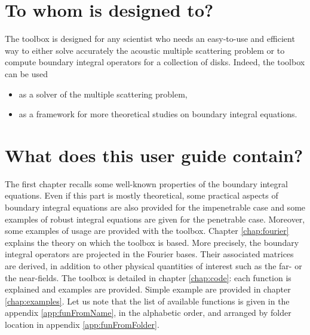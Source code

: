 \section*{To whom \mudiff is designed to?}

The toolbox \mudiff is designed for any  scientist who needs an easy-to-use and efficient way to either solve accurately the acoustic multiple scattering problem  or
 to compute boundary integral operators for a collection of disks. Indeed, the \mudiff toolbox can be used
\begin{itemize}
\item as a solver of the multiple scattering problem,%
\item as a framework for more theoretical studies on boundary integral equations.%
\end{itemize}


\section*{What does this user guide contain?}

The first chapter recalls some well-known properties of the boundary integral equations. Even if this part is mostly theoretical, some practical
aspects of boundary integral equations are also provided for the impenetrable case and some examples of robust integral equations are given for the
 penetrable case. Moreover, some examples of usage are provided with the \mudiff toolbox. Chapter \ref{chap:fourier} explains the theory on which the \mudiff toolbox is based. More precisely, the boundary integral operators are projected in the Fourier bases. Their associated matrices are derived, in addition to other physical
  quantities of interest such as the far- or the near-fields. The \mudiff toolbox is detailed in chapter  \ref{chap:code}: each function is explained and
   examples are provided. Simple example are provided in chapter \ref{chap:examples}.
   Let us note that the list of available functions is given in the appendix  \ref{app:funFromName}, in the alphabetic order, and arranged by folder location in appendix \ref{app:funFromFolder}.

